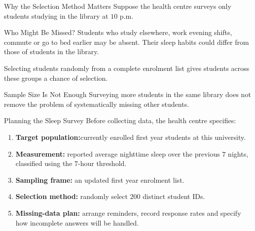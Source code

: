 \documentclass[aspectratio=169]{beamer}
\begin{document}
\begin{frame}{Why the Selection Method Matters}
Suppose the health centre surveys only students studying in the library at $10$ p.m.

\begin{block}{Who Might Be Missed?}
Students who study elsewhere, work evening shifts, commute or go to bed earlier may be absent. Their sleep habits could differ from those of students in the library.
\end{block}

Selecting students randomly from a complete enrolment list gives students across these groups a chance of selection.

\begin{alertblock}{Sample Size Is Not Enough}
Surveying more students in the same library does not remove the problem of systematically missing other students.
\end{alertblock}
\end{frame}

\begin{frame}{Planning the Sleep Survey}
Before collecting data, the health centre specifies:
\begin{enumerate}
	\item \textbf{Target population:}currently enrolled first year students at this university.
	\item \textbf{Measurement:} reported average nighttime sleep over the previous $7$ nights, classified using the $7$-hour threshold.
	\item \textbf{Sampling frame:} an updated first year enrolment list.
	\item \textbf{Selection method:} randomly select $200$ distinct student IDs.
	\item \textbf{Missing-data plan:} arrange reminders, record response rates and specify how incomplete answers will be handled.
\end{enumerate}
\end{frame}
\end{document}
